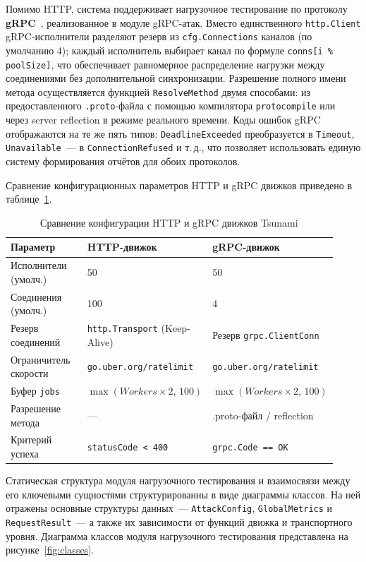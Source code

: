 Помимо HTTP, система поддерживает нагрузочное тестирование по протоколу \textbf{gRPC}~\cite{grpcgo}, реализованное в модуле gRPC-атак.
Вместо единственного \texttt{http.Client} gRPC-исполнители разделяют резерв из \texttt{cfg.Connections} каналов (по умолчанию 4); каждый исполнитель выбирает канал по формуле \texttt{conns[i \% poolSize]}, что обеспечивает равномерное распределение нагрузки между соединениями без дополнительной синхронизации.
Разрешение полного имени метода осуществляется функцией \texttt{ResolveMethod} двумя способами: из предоставленного \texttt{.proto}-файла с помощью компилятора \texttt{protocompile} или через server reflection в режиме реального времени.
Коды ошибок gRPC отображаются на те же пять типов: \texttt{DeadlineExceeded} преобразуется в \texttt{Timeout}, \texttt{Unavailable}~--- в \texttt{ConnectionRefused} и т.\,д., что позволяет использовать единую систему формирования отчётов для обоих протоколов.

Сравнение конфигурационных параметров HTTP и gRPC движков приведено в таблице~\ref{tab:ch2-http-grpc}.

\begin{table}[h!]
  \centering
  \caption{Сравнение конфигурации HTTP и gRPC движков Tsunami}
  \label{tab:ch2-http-grpc}
  \small
  \begin{tabular}{|p{0.30\linewidth}|p{0.31\linewidth}|p{0.31\linewidth}|}
    \hline
    \textbf{Параметр} & \textbf{HTTP-движок} & \textbf{gRPC-движок} \\
    \hline
    Исполнители (умолч.) & 50 & 50 \\
    \hline
    Соединения (умолч.) & 100 & 4 \\
    \hline
    Резерв соединений & \texttt{http.Transport} (Keep-Alive) & Резерв \texttt{grpc.ClientConn} \\
    \hline
    Ограничитель скорости & \texttt{go.uber.org/ratelimit} & \texttt{go.uber.org/ratelimit} \\
    \hline
    Буфер \texttt{jobs} & $\max(\mathit{Workers}{\times}2,\,100)$ & $\max(\mathit{Workers}{\times}2,\,100)$ \\
    \hline
    Разрешение метода & --- & .proto-файл / reflection \\
    \hline
    Критерий успеха & \texttt{statusCode < 400} & \texttt{grpc.Code == OK} \\
    \hline
  \end{tabular}
\end{table}

Статическая структура модуля нагрузочного тестирования и взаимосвязи
между его ключевыми сущностями структурированны в виде диаграммы классов.
На ней отражены основные структуры данных~--- \texttt{AttackConfig},
\texttt{GlobalMetrics} и \texttt{RequestResult}~--- а также их зависимости
от функций движка и транспортного уровня.
Диаграмма классов модуля нагрузочного тестирования представлена на рисунке~\ref{fig:classes}.

